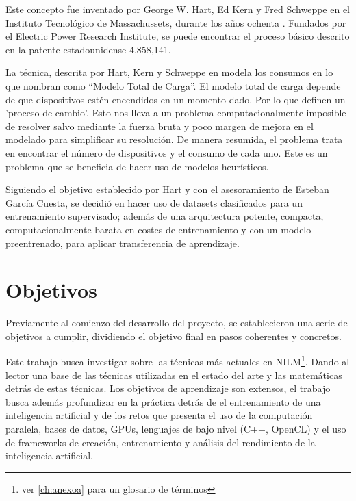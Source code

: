 Este concepto fue inventado por George W. Hart, Ed Kern y Fred Schweppe en el Instituto Tecnológico de Massachussets, durante los años ochenta \autocite{192069}. Fundados por el Electric Power Research Institute, se puede encontrar el proceso básico descrito en la patente estadounidense 4,858,141.

La técnica, descrita por Hart, Kern y Schweppe en \autocite{192069} modela los consumos en lo que nombran como \enquote{Modelo Total de Carga}. El modelo total de carga depende de que dispositivos estén encendidos en un momento dado. Por lo que definen un 'proceso de cambio'.
Esto nos lleva a un problema computacionalmente imposible de resolver salvo mediante la fuerza bruta\autocite[4]{192069} y poco margen de mejora en el modelado para simplificar su resolución. De manera resumida, el problema trata en encontrar el número de dispositivos y el consumo de cada uno. 
Este es un problema que se beneficia de hacer uso de modelos heurísticos.

Siguiendo el objetivo establecido por Hart y con el asesoramiento de Esteban García Cuesta, se decidió en hacer uso de datasets clasificados para un entrenamiento supervisado; además de una arquitectura potente, compacta, computacionalmente barata en costes de entrenamiento y con un modelo preentrenado, para aplicar transferencia de aprendizaje. 




\section{Objetivos}
\label{sec:objetivos}
Previamente al comienzo del desarrollo del proyecto, se establecieron una serie de objetivos a cumplir, dividiendo el objetivo final en pasos coherentes y concretos.

Este trabajo busca investigar sobre las técnicas más actuales en NILM\footnote{ver \autoref{ch:anexoa} para un glosario de términos}. Dando al lector una base de las técnicas utilizadas en el estado del arte y las matemáticas detrás de estas técnicas.
Los objetivos de aprendizaje son extensos, el trabajo busca además profundizar en la práctica detrás de el entrenamiento de una inteligencia artificial y de los retos que presenta el uso de la computación paralela, bases de datos, GPUs, lenguajes de bajo nivel (C++, OpenCL) y el uso de frameworks de creación, entrenamiento y análisis del rendimiento de la inteligencia artificial.


